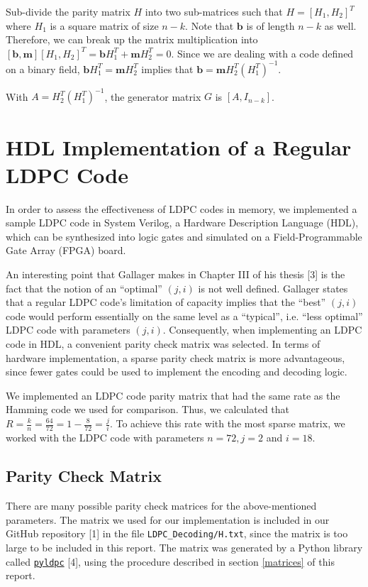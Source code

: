 \documentclass[conference]{IEEEtran}
\begin{document}
Sub-divide the parity matrix $H$ into two sub-matrices such that $H = [H_1, H_2]^T$ where $H_1$ is a square matrix of size $n-k$.
    Note that $\textbf{b}$ is of length $n-k$ as well.
    Therefore, we can break up the matrix
    multiplication into $[\textbf{b}, \textbf{m}][H_1, H_2]^T = \textbf{b}H_1^T + \textbf{m}H_2^T = 0$.
Since we are dealing with a code defined on a binary field, $\textbf{b}H_1^T = \textbf{m}H_2^T$ implies that $\textbf{b}= \textbf{m}H_2^T(H_1^T)^{-1}$.

    With $A = H_2^T(H_1^T)^{-1}$, the generator matrix $G$ is $[A, I_{n-k}]$.

\section{HDL Implementation of a Regular LDPC Code}
In order to assess the effectiveness of LDPC codes in memory, we implemented a sample LDPC code in System Verilog, a Hardware Description Language (HDL), which can be synthesized into logic gates and simulated on a Field-Programmable Gate Array (FPGA) board.

An interesting point that Gallager makes in Chapter III of his thesis [3] is the fact that the notion of an ``optimal'' $(j,i)$ is not well defined.
Gallager states that a regular LDPC code's limitation of capacity implies that the ``best'' $(j,i)$ code would perform essentially on the same level as a ``typical'', i.e. ``less optimal'' LDPC code with parameters $(j,i)$.
Consequently, when implementing an LDPC code in HDL, a convenient parity check matrix was selected.
In terms of hardware implementation, a sparse parity check matrix is more advantageous, since fewer gates could be used to implement the encoding and decoding logic.

We implemented an LDPC code parity matrix that had the same rate as 
the Hamming code we used for comparison.
Thus, we calculated that $R=\frac{k}{n}=\frac{64}{72}=1-\frac{8}{72} = \frac{j}{i}$.
To achieve this rate with the most sparse matrix, we worked with the LDPC code with parameters $n=72, j=2$ and $i=18$.

\subsection{Parity Check Matrix}
There are many possible parity check matrices for the above-mentioned parameters. The matrix we used for our implementation is included in our GitHub repository [1] in the file \verb+LDPC_Decoding/H.txt+,
since the matrix is too large to be included in this report. The matrix was generated by a Python library called \href{https://hichamjanati.github.io/pyldpc/}{\texttt{pyldpc}} [4], using the procedure described in section \ref{matrices} of this report.
\end{document}
